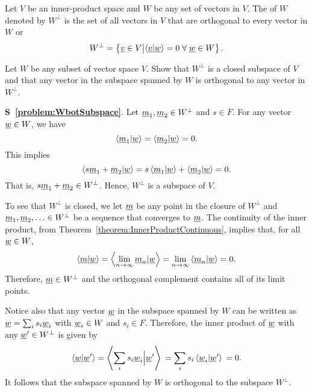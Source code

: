 \begin{definition}
Let $V$ be an inner-product space and $W$ be any set of vectors in $V$.
The  of $W$ denoted by $W^{\bot}$ is the set of all vectors in $V$ that are orthogonal to every vector in $W$ or
\begin{equation*}
W^{\bot} = \left\{ \underline{v} \in V \big| \langle \underline{v} | \underline{w} \rangle = 0 \; \forall \; \underline{w}\in W \right\}. 
\end{equation*}
\end{definition}

\begin{problem} \label{problem:WbotSubspace}
Let $W$ be any subset of vector space $V$.
Show that $W^{\bot}$ is a closed subspace of $V$ and that any vector in the subspace spanned by $W$ is orthogonal to any vector in $W^{\bot}$.
\end{problem}
\noindent
\textbf{S~\ref{problem:WbotSubspace}}.
Let $\underline{m}_1, \underline{m}_2 \in W^{\bot}$ and $s \in F$.
For any vector $\underline{w} \in W$, we have
\begin{equation*}
\left\langle \underline{m}_1 | \underline{w} \right\rangle
= \left\langle \underline{m}_2 | \underline{w} \right\rangle
= 0.
\end{equation*}
This implies
\begin{equation*}
\left\langle s \underline{m}_1 + \underline{m}_2 | \underline{w} \right\rangle
= s \left\langle \underline{m}_1 | \underline{w} \right\rangle
+ \left\langle \underline{m}_2 | \underline{w} \right\rangle
= 0.
\end{equation*}
That is, $s \underline{m}_1 + \underline{m}_2 \in W^{\bot}$.
Hence, $W^{\bot}$ is a subspace of $V$.

To see that $W^{\bot}$ is closed, we let $\underline{m}$ be any point in the closure of $W^{\bot}$ and $\underline{m}_1,\underline{m}_2,\ldots \in W^{\bot}$ be a sequence that converges to $\underline{m}$.
The continuity of the inner product, from Theorem~\ref{theorem:InnerProductContinuous}, implies that, for all $\underline{w}\in W$,
\[ \left\langle \underline{m} | \underline{w} \right\rangle =  \left\langle \lim_{n\rightarrow\infty} \underline{m}_n | \underline{w}  \right\rangle  =  \lim_{n\rightarrow\infty}  \left\langle \underline{m}_n | \underline{w}  \right\rangle = 0. \]
Therefore, $\underline{m} \in W^{\bot}$ and the orthogonal complement contains all of its limit points.

Notice also that any vector $\underline{w}$ in the subspace spanned by $W$ can be written as $\underline{w} = \sum_{i} s_i \underline{w}_i$ with $\underline{w}_i \in W$ and $s_i \in F$.
Therefore, the inner product of $\underline{w}$ with any $\underline{w}' \in W^{\bot}$ is given by
\begin{equation*}
\left\langle \underline{w} | \underline{w}' \right\rangle
= \left\langle \sum_{i} s_i \underline{w}_i \Big| \underline{w}' \right\rangle \\
= \sum_{i} s_i \left\langle \underline{w}_i | \underline{w}' \right\rangle \\
= 0.
\end{equation*}
It follows that the subspace spanned by $W$ is orthogonal to the subspace $W^{\bot}$.

